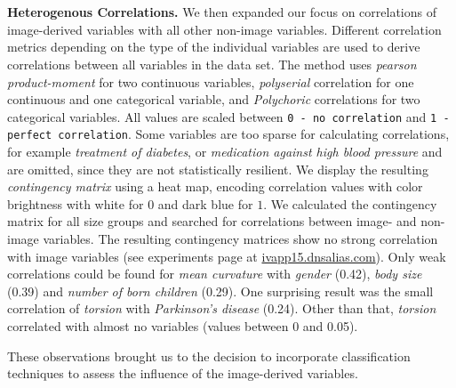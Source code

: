 \documentclass[a4paper,twoside]{style/article}
\begin{document}
\\\\
\noindent \textbf{Heterogenous Correlations.}
We then expanded our focus on correlations of image-derived variables with all other non-image variables.
Different correlation metrics depending on the type of the individual variables are used to derive correlations between all variables in the data set.
The method uses \emph{pearson product-moment} for two continuous variables, \emph{polyserial} correlation for one continuous and one categorical variable, and \emph{Polychoric} correlations for two categorical variables.
All values are scaled between \texttt{0 - no correlation} and \texttt{1 - perfect correlation}.
Some variables are too sparse for calculating correlations, for example \emph{treatment of diabetes}, or \emph{medication against high blood pressure} and are omitted, since they are not statistically resilient.
We display the resulting \emph{contingency matrix} using a heat map, encoding correlation values with color brightness with white for $0$ and dark blue for $1$.
We calculated the contingency matrix for all size groups and searched for correlations between image- and non-image variables.
The resulting contingency matrices show no strong correlation with image variables (see experiments page at \url{ivapp15.dnsalias.com}).
Only weak correlations could be found for \emph{mean curvature} with \emph{gender} (0.42), \emph{body size} (0.39) and \emph{number of born children} (0.29).
One surprising result was the small correlation of \emph{torsion} with \emph{Parkinson's disease} (0.24).
Other than that, \emph{torsion} correlated with almost no variables (values between 0 and 0.05).

These observations brought us to the decision to incorporate classification techniques to assess the influence of the image-derived variables.
\end{document}

